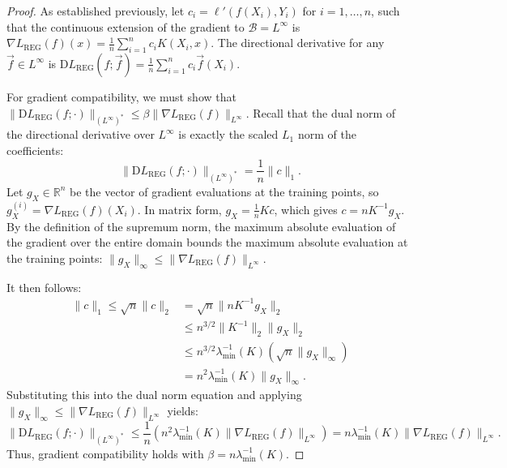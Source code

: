 \documentclass{article}
\newcommand{\R}{\mathbb{R}}
\newcommand{\D}{\mathrm{D}}
\begin{document}
\begin{proof}
    As established previously, let $c_i = \ell'(f(X_i), Y_i)$ for $i=1, \dots, n$, such that the continuous extension of the gradient to $\mathcal{B} = L^\infty$ is $\nabla L_\mathrm{REG}(f)(x) = \frac{1}{n} \sum_{i=1}^n c_i K(X_i, x)$. The directional derivative for any $\vec{f} \in L^\infty$ is $\D L_\mathrm{REG}(f; \vec{f}) = \frac{1}{n} \sum_{i=1}^n c_i \vec{f}(X_i)$.

    For gradient compatibility,
    we must show that $\lVert \D L_\mathrm{REG}(f; \cdot) \rVert_{(L^\infty)^*} \leq \beta \lVert \nabla L_\mathrm{REG}(f) \rVert_{L^\infty}$.
    Recall that the dual norm of the directional derivative over $L^\infty$ is exactly the scaled $L_1$ norm of the coefficients:
    \[
        \lVert \D L_\mathrm{REG}(f; \cdot) \rVert_{(L^\infty)^*} = \frac{1}{n} \lVert c \rVert_1.
    \]
    Let $g_X \in \R^n$ be the vector of gradient evaluations at the training points, so $g_X^{(i)} = \nabla L_\mathrm{REG}(f)(X_i)$. In matrix form, $g_X = \frac{1}{n} K c$, which gives $c = n K^{-1} g_X$. 
    By the definition of the supremum norm, the maximum absolute evaluation of the gradient over the entire domain bounds the maximum absolute evaluation at the training points: $\lVert g_X \rVert_\infty \leq \lVert \nabla L_\mathrm{REG}(f) \rVert_{L^\infty}$.

    It then follows:
    \begin{align*}
        \lVert c \rVert_1 
        \leq \sqrt{n} \lVert c \rVert_2 
        &= \sqrt{n} \lVert n K^{-1} g_X \rVert_2 \\
        &\leq n^{3/2} \lVert K^{-1} \rVert_2 \lVert g_X \rVert_2 \\
        &\leq n^{3/2} \lambda_{\min}^{-1}(K) \left( \sqrt{n} \lVert g_X \rVert_\infty \right) \\
        &= n^2 \lambda_{\min}^{-1}(K) \lVert g_X \rVert_\infty.
    \end{align*}
    Substituting this into the dual norm equation and applying $\lVert g_X \rVert_\infty \leq \lVert \nabla L_\mathrm{REG}(f) \rVert_{L^\infty}$ yields:
    \[
        \lVert \D L_\mathrm{REG}(f; \cdot) \rVert_{(L^\infty)^*} \leq \frac{1}{n} \left( n^2 \lambda_{\min}^{-1}(K) \lVert \nabla L_\mathrm{REG}(f) \rVert_{L^\infty} \right) = n \lambda_{\min}^{-1}(K) \lVert \nabla L_\mathrm{REG}(f) \rVert_{L^\infty}.
    \]
    Thus, gradient compatibility holds with $\beta = n \lambda_{\min}^{-1}(K)$.


\end{proof}
\end{document}
